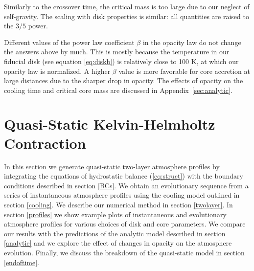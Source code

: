 \documentclass[apj]{emulateapj}
\newcommand{\App}[1]{Appendix~\ref{#1}}
\newcommand{\di}{_{\rm d}}
\newcommand{\cb}{_{\rm RCB}}
\begin{document}
Similarly to the crossover time, the critical mass is too large due to our neglect of self-gravity.  The scaling with disk properties is similar: all quantities are raised to the $3/5$ power.  


Different values of the power law coefficient $\beta$ in the opacity law do not change the answers above by much.  This is mostly because the temperature in our fiducial disk (see equation \ref{eq:diskb}) is relatively close to 100 K, at which our opacity law is normalized. A higher $\beta$ value is more favorable for core accretion at large distances due to the sharper drop in opacity. The effects of opacity on the cooling time and critical core mass are discussed in \App{sec:analytic}.








%




\section{Quasi-Static Kelvin-Helmholtz Contraction}
\label{KH}

In this section we generate quasi-static two-layer atmosphere profiles by integrating the equations of hydrostatic balance (\ref{eq:struct}) with the boundary conditions described in section \ref{BCs}. We obtain an evolutionary sequence from a series of instantaneous atmosphere profiles using the cooling model outlined in section \ref{cooling}. We describe our numerical method in section \ref{twolayer}. In section \ref{profiles} we show example plots of instantaneous and evolutionary atmosphere profiles for various choices of disk and core parameters. We compare our results with the predictions of the analytic model described in section \ref{analytic} and we explore the effect of changes in opacity on the atmosphere evolution. Finally, we discuss the breakdown of the quasi-static model in section \ref{endoftime}.
\end{document}
